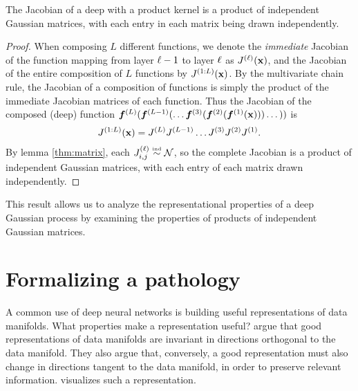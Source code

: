 \begin{theorem}
\label{thm:prodjacob}
The Jacobian of a deep \gp{} with a product kernel is a product of independent Gaussian matrices, with each entry in each matrix being drawn independently.
\end{theorem}
%
\begin{proof}
When composing $L$ different functions, we denote the \emph{immediate} Jacobian of the function mapping from layer $\ell -1$ to layer $\ell$ as $J^{(\ell)}({\bf{x}})$, and the Jacobian of the entire composition of $L$ functions by $J^{(1:L)}({\bf{x}})$.
%
By the multivariate chain rule, the Jacobian of a composition of functions is simply the product of the immediate Jacobian matrices of each function.  
%
Thus the Jacobian of the composed (deep) function $\boldsymbol{f}^{(L)}(\boldsymbol{f}^{(L-1)}(\dots \boldsymbol{f}^{(3)}( \boldsymbol{f}^{(2)}( \boldsymbol{f}^{(1)}({\bf{x}})))\dots))$ is
%
%
\begin{align}
 J^{(1:L)}({\bf{x}}) 
= J^{(L)} J^{(L-1)} \dots J^{(3)} J^{(2)} J^{(1)}.
\label{eq:jacobian-of-deep-gp}
\end{align}
%
By lemma \ref{thm:matrix}, each ${J^{(\ell)}_{i,j} \overset{\mbox{\tiny \textnormal{ind}}}{\sim} \mathcal{N}}$, so the complete Jacobian is a product of independent Gaussian matrices, with each entry of each matrix drawn independently.
\end{proof}

This result allows us to analyze the representational properties of a deep Gaussian process by examining the properties of products of independent Gaussian matrices.






\section{Formalizing a pathology}
\label{sec:formalizing-pathology}

A common use of deep neural networks is building useful representations of data manifolds.
What properties make a representation useful?
\citet{rifai2011higher} argue that good representations of data manifolds are invariant in directions orthogonal to the data manifold.
They also argue that, conversely, a good representation must also change in directions tangent to the data manifold, in order to preserve relevant information.
 visualizes such a representation.

